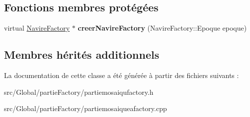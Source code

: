 \subsection*{Fonctions membres protégées}
\begin{DoxyCompactItemize}
\item 
virtual \hyperlink{class_navire_factory}{Navire\+Factory} $\ast$ {\bfseries creer\+Navire\+Factory} (Navire\+Factory\+::\+Epoque epoque)\hypertarget{class_partie_mosaique_factory_a70ded06da7f02a92db150eafce9e32a1}{}\label{class_partie_mosaique_factory_a70ded06da7f02a92db150eafce9e32a1}

\end{DoxyCompactItemize}
\subsection*{Membres hérités additionnels}


La documentation de cette classe a été générée à partir des fichiers suivants \+:\begin{DoxyCompactItemize}
\item 
src/\+Global/partie\+Factory/partiemosaiqufactory.\+h\item 
src/\+Global/partie\+Factory/partiemosaiqueafactory.\+cpp\end{DoxyCompactItemize}
